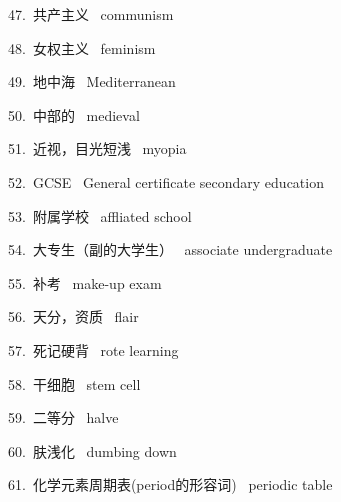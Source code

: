 \documentclass[a4paper, 12pt]{article}
\begin{document}
\begin{multicols}{2}
\begin{flushleft}
47.\ 共产主义 \ communism
\end{flushleft}

\begin{flushleft}
48.\ 女权主义 \ feminism
\end{flushleft}
\end{multicols}

\begin{multicols}{2}
\begin{flushleft}
49.\ 地中海 \ Mediterranean
\end{flushleft}

\begin{flushleft}
50.\ 中部的 \ medieval
\end{flushleft}
\end{multicols}

\begin{multicols}{2}
\begin{flushleft}
51.\ 近视，目光短浅 \ myopia
\end{flushleft}

\begin{flushleft}
52.\ GCSE \ General certificate secondary education 
\end{flushleft}
\end{multicols}

\begin{multicols}{2}
\begin{flushleft}
53.\ 附属学校 \ affliated school
\end{flushleft}

\begin{flushleft}
54.\ 大专生（副的大学生） \ associate undergraduate
\end{flushleft}
\end{multicols}

\begin{multicols}{2}
\begin{flushleft}
55.\ 补考 \ make-up exam
\end{flushleft}

\begin{flushleft}
56.\ 天分，资质 \ flair
\end{flushleft}
\end{multicols}

\begin{multicols}{2}
\begin{flushleft}
57.\ 死记硬背 \ rote learning
\end{flushleft}

\begin{flushleft}
58.\ 干细胞 \ stem cell
\end{flushleft}
\end{multicols}

\begin{multicols}{2}
\begin{flushleft}
59.\ 二等分 \ halve
\end{flushleft}

\begin{flushleft}
60.\ 肤浅化 \ dumbing down
\end{flushleft}
\end{multicols}

\begin{multicols}{2}
\begin{flushleft}
61.\ 化学元素周期表(period的形容词) \ periodic table
\end{flushleft}
\end{multicols}
\end{document}
